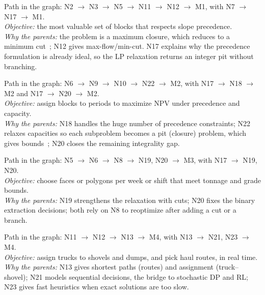 \documentclass[11pt,a4paper]{article}
\begin{document}
\begin{description}[leftmargin=0pt, style=nextline]
\item[Ultimate pit limit (M1).]
  Path in the graph: N2 $\to$ N3 $\to$ N5 $\to$ N11 $\to$ N12 $\to$ M1, with N7 $\to$ N17 $\to$ M1.\\
  \emph{Objective:} the most valuable set of blocks that respects slope precedence.\\
  \emph{Why the parents:} the problem is a maximum closure, which reduces to a
  minimum cut~\cite{picard1976maximal}; N12 gives max-flow/min-cut. N17
  explains why the precedence formulation is already ideal, so the LP
  relaxation returns an integer pit without branching.

\item[Long-term production scheduling (M2).]
  Path in the graph: N6 $\to$ N9 $\to$ N10 $\to$ N22 $\to$ M2, with N17 $\to$ N18 $\to$ M2 and N17 $\to$ N20 $\to$ M2.\\
  \emph{Objective:} assign blocks to periods to maximize NPV under precedence
  and capacity.\\
  \emph{Why the parents:} N18 handles the huge number of precedence
  constraints; N22 relaxes capacities so each subproblem becomes a pit
  (closure) problem, which gives bounds~\cite{bienstock2010solving}; N20
  closes the remaining integrality gap.

\item[Short-term planning and ore blending (M3).]
  Path in the graph: N5 $\to$ N6 $\to$ N8 $\to$ N19, N20 $\to$ M3, with N17 $\to$ N19, N20.\\
  \emph{Objective:} choose faces or polygons per week or shift that meet
  tonnage and grade bounds.\\
  \emph{Why the parents:} N19 strengthens the relaxation with cuts; N20 fixes
  the binary extraction decisions; both rely on N8 to reoptimize after adding
  a cut or a branch.

\item[Truck dispatching and haul routing (M4).]
  Path in the graph: N11 $\to$ N12 $\to$ N13 $\to$ M4, with N13 $\to$ N21, N23 $\to$ M4.\\
  \emph{Objective:} assign trucks to shovels and dumps, and pick haul routes,
  in real time.\\
  \emph{Why the parents:} N13 gives shortest paths (routes) and assignment
  (truck--shovel); N21 models sequential decisions, the bridge to stochastic
  DP and RL; N23 gives fast heuristics when exact solutions are too slow.


\end{description}
\end{document}
